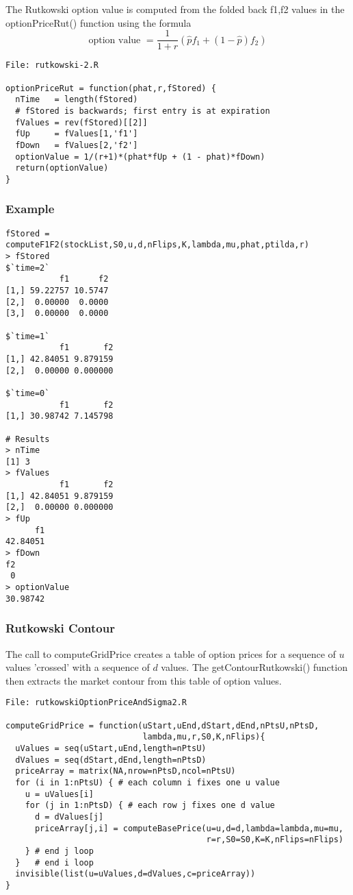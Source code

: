 \documentclass[10pt]{article}
\begin{document}
The Rutkowski option value is computed from the folded back f1,f2 values in the optionPriceRut() function
using the formula
\[
\text{option value } = \frac{1}{1+r} \left(\hat{p} f_1 + (1-\hat{p}) f_2\right)
\]

\begin{verbatim}
File: rutkowski-2.R

optionPriceRut = function(phat,r,fStored) {
  nTime   = length(fStored)
  # fStored is backwards; first entry is at expiration
  fValues = rev(fStored)[[2]]
  fUp     = fValues[1,'f1']
  fDown   = fValues[2,'f2']
  optionValue = 1/(r+1)*(phat*fUp + (1 - phat)*fDown)
  return(optionValue)
}
\end{verbatim}

\subsubsection*{Example}

\begin{verbatim}
fStored = computeF1F2(stockList,S0,u,d,nFlips,K,lambda,mu,phat,ptilda,r)
> fStored
$`time=2`
           f1      f2
[1,] 59.22757 10.5747
[2,]  0.00000  0.0000
[3,]  0.00000  0.0000

$`time=1`
           f1       f2
[1,] 42.84051 9.879159
[2,]  0.00000 0.000000

$`time=0`
           f1       f2
[1,] 30.98742 7.145798

# Results
> nTime
[1] 3
> fValues
           f1       f2
[1,] 42.84051 9.879159
[2,]  0.00000 0.000000
> fUp
      f1
42.84051
> fDown
f2
 0
> optionValue
30.98742
\end{verbatim}


\subsubsection*{Rutkowski Contour}

The call to computeGridPrice creates a table of option prices for a sequence of $u$ values 'crossed' with a
sequence of $d$ values. The getContourRutkowski() function then extracts the market contour from this
table of option values.


\begin{verbatim}
File: rutkowskiOptionPriceAndSigma2.R

computeGridPrice = function(uStart,uEnd,dStart,dEnd,nPtsU,nPtsD,
                            lambda,mu,r,S0,K,nFlips){
  uValues = seq(uStart,uEnd,length=nPtsU)
  dValues = seq(dStart,dEnd,length=nPtsD)
  priceArray = matrix(NA,nrow=nPtsD,ncol=nPtsU)
  for (i in 1:nPtsU) { # each column i fixes one u value
    u = uValues[i]
    for (j in 1:nPtsD) { # each row j fixes one d value
      d = dValues[j]
      priceArray[j,i] = computeBasePrice(u=u,d=d,lambda=lambda,mu=mu,
                                         r=r,S0=S0,K=K,nFlips=nFlips)
    } # end j loop
  }   # end i loop
  invisible(list(u=uValues,d=dValues,c=priceArray))
}
\end{verbatim}
\end{document}
